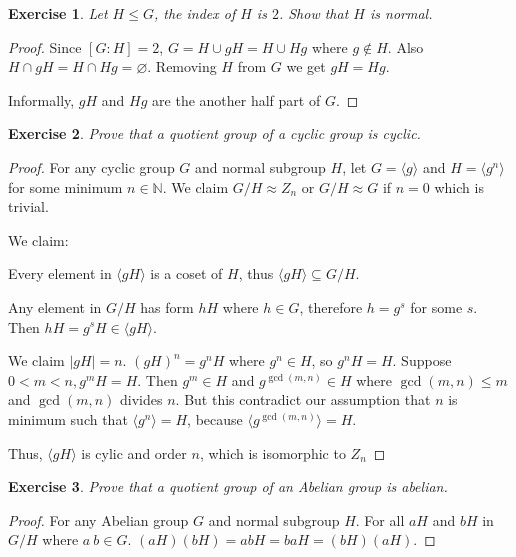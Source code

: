 \documentclass[14pt]{extarticle}
\newtheorem{exercise}{Exercise}[section]
\newcommand{\N}{\mathbb{N}}
\newcommand{\1}{\{ e \}}
\begin{document}
\setcounter{exercise}{8}
\begin{exercise}
  Let $H \leq G$, the index of $H$ is $2$. Show that $H$ is normal.
\end{exercise}
\begin{proof}
  Since $[G:H] = 2$, $G = H \cup gH = H \cup Hg$ where $g \notin H$.
  Also $H \cap gH = H \cap Hg = \varnothing$. Removing $H$ from $G$ we get
  $gH = Hg$.

  Informally, $gH$ and $Hg$ are the another half part of $G$.
\end{proof}

\setcounter{exercise}{10}
\begin{exercise}
  Prove that a quotient group of a cyclic group is cyclic.
\end{exercise}
\begin{proof}
  For any cyclic group $G$ and normal subgroup $H$,
  let $G = \langle g \rangle$ and $H = \langle g^n \rangle$ for some minimum $n \in \N$.
  We claim $G/H \approx Z_n$ or $G/H \approx G$ if $n = 0$ which is trivial.

  We claim:
  {
    \newcommand{\gH}{\langle gH \rangle}
    \newcommand{\GH}{G/H}

    \begin{center}
      \boxed{\gH = \GH}
    \end{center}


    Every element in $\gH$ is a coset of $H$, thus $\gH \subseteq \GH$.

    Any element in $\GH$ has form $hH$ where $h \in G$, therefore $h = g^s$ for some $s$.
    Then $hH = g^sH \in \langle gH \rangle$.

    We claim $| gH | = n$.
    $(gH)^n = g^nH$ where $g^n \in H$, so $g^nH = H$.
    Suppose $0 < m < n, g^mH = H$. Then $g^m \in H$ and $g^{\gcd(m, n)} \in H$
    where $\gcd(m, n) \le m$ and $\gcd(m, n)$ divides $n$.
    But this contradict our assumption that $n$ is minimum such that $\langle g^n \rangle = H$,
    because $\langle g^{\gcd(m, n)} \rangle = H$.

    Thus, $\gH$ is cylic and order $n$, which is isomorphic to $Z_n$
  }
\end{proof}

\begin{exercise}
  Prove that a quotient group of an Abelian group is abelian.
\end{exercise}
\begin{proof}
  For any Abelian group $G$ and normal subgroup $H$. For all $aH$ and $bH$ in $G/H$
  where $a \ b \in G$.
  $(aH)(bH) = abH = baH = (bH)(aH)$.
\end{proof}
\end{document}

